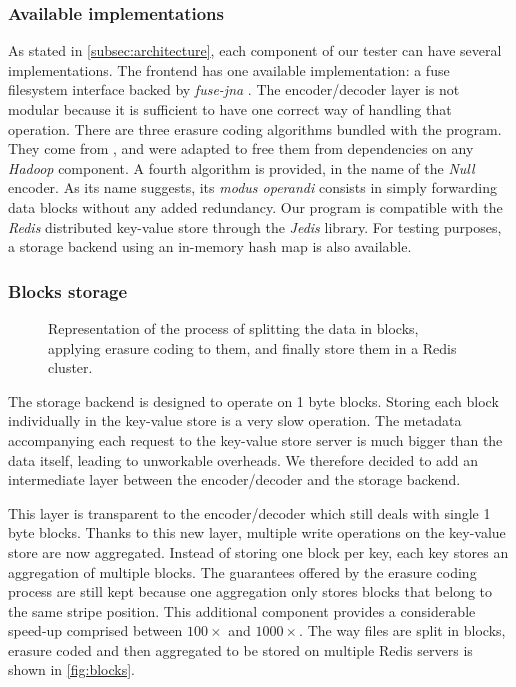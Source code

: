 \subsubsection{Available implementations}

As stated in \autoref{subsec:architecture}, each component of our tester can have several implementations.
The frontend has one available implementation: a \ac{fuse} filesystem interface backed by \textit{fuse-jna} \cite{fuse-jna}.
The encoder/decoder layer is not modular because it is sufficient to have one correct way of handling that operation.
There are three erasure coding algorithms bundled with the program.
They come from \cite{XorbasVLDB}, and were adapted to free them from dependencies on any \textit{Hadoop} component.
A fourth algorithm is provided, in the name of the \textit{Null} encoder.
As its name suggests, its \textit{modus operandi} consists in simply forwarding data blocks without any added redundancy.
Our program is compatible with the \textit{Redis} distributed key-value store through the \textit{Jedis} library.
For testing purposes, a storage backend using an in-memory hash map is also available.

\subsubsection{Blocks storage}

\begin{figure}[H]
    \centering
    
    \caption{Representation of the process of splitting the data in blocks, applying erasure coding to them, and finally store them in a Redis cluster.}
    \label{fig:blocks}
\end{figure}

The storage backend is designed to operate on 1 byte blocks.
Storing each block individually in the key-value store is a very slow operation.
The metadata accompanying each request to the key-value store server is much bigger than the data itself, leading to unworkable overheads.
We therefore decided to add an intermediate layer between the encoder/decoder and the storage backend.

This layer is transparent to the encoder/decoder which still deals with single 1 byte blocks.
Thanks to this new layer, multiple write operations on the key-value store are now aggregated.
Instead of storing one block per key, each key stores an aggregation of multiple blocks.
The guarantees offered by the erasure coding process are still kept because one aggregation only stores blocks that belong to the same stripe position.
This additional component provides a considerable speed-up comprised between $100\times$ and $1000\times$.
The way files are split in blocks, erasure coded and then aggregated to be stored on multiple Redis servers is shown in \autoref{fig:blocks}.


